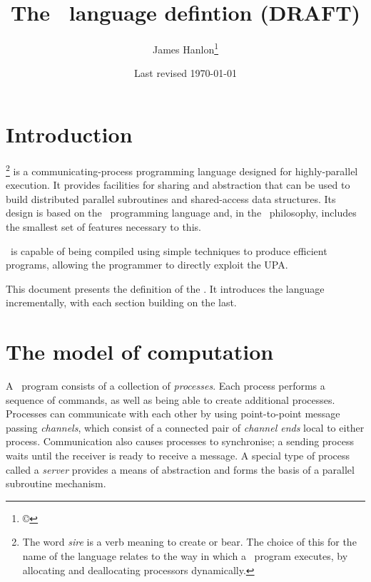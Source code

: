 \documentclass[11pt,a4paper,parskip=half-]{scrartcl}
\title{The \sire\ language defintion (DRAFT)}
\author{James Hanlon\footnote{\copyright}}
\date{Last revised \today}
\begin{document}
\maketitle

\setcounter{tocdepth}{2}
\tableofcontents

\clearpage\section{Introduction}

\def\sirewordfootnote{The word \emph{sire} is a verb meaning to create or bear.
The choice of this for the name of the language relates to the way in which a
\sire\ program executes, by allocating and deallocating processors dynamically.}

\emph{\Sire}\footnote{\sirewordfootnote} is a communicating-process programming
language designed for highly-parallel execution.
%
It provides facilities for sharing and abstraction that can be used to
build distributed parallel subroutines and shared-access data structures.
%
Its design is based on the \occam\ programming language and, in the \occam\
philosophy, includes the smallest set of features necessary to this.

\Sire\ is capable of being compiled using simple techniques to produce
efficient programs, allowing the programmer to directly exploit the UPA.

This document presents the definition of the \sire. It introduces the
language incrementally, with each section building on the last.


\section{The model of computation}

A \sire\ program consists of a collection of \emph{processes}. Each process
performs a sequence of commands, as well as being able to create additional
processes.
%
Processes can communicate with each other by using point-to-point message
passing \emph{channels}, which consist of a connected pair of \emph{channel
ends} local to either process. Communication also causes processes
to synchronise; a sending process waits until the receiver is ready to receive
a message.
%
A special type of process called a \emph{server} provides a means of
abstraction and forms the basis of a parallel subroutine mechanism.
\end{document}
